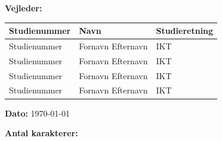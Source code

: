 \begin{center}
	\ifdefined\frontpageSupervisor
	\textbf{Vejleder:} \frontpageSupervisor\\
	\fi
	\vspace{5pt}
	\begin{tabular}{|l|l|l|}
		\hline
		\rowcolor{blue!25}
		\textbf{Studienummer} & \textbf{Navn} & \textbf{Studieretning} \\ [2pt]
		\hline
		Studienummer & Fornavn Efternavn & IKT \\
		\hline
		Studienummer & Fornavn Efternavn & IKT \\
		\hline
		Studienummer & Fornavn Efternavn & IKT \\
		\hline
		Studienummer & Fornavn Efternavn & IKT \\
		\hline
	\end{tabular}

	{\fontsize{10pt}{0}\selectfont
		\textbf{Dato: } \today\\
	}
	\vspace{5pt}
	
	\ifdefined\frontpageCharacters
		\textbf{Antal karakterer: } \frontpageCharacters\\
	\fi
	\vspace{30pt}

\end{center}
